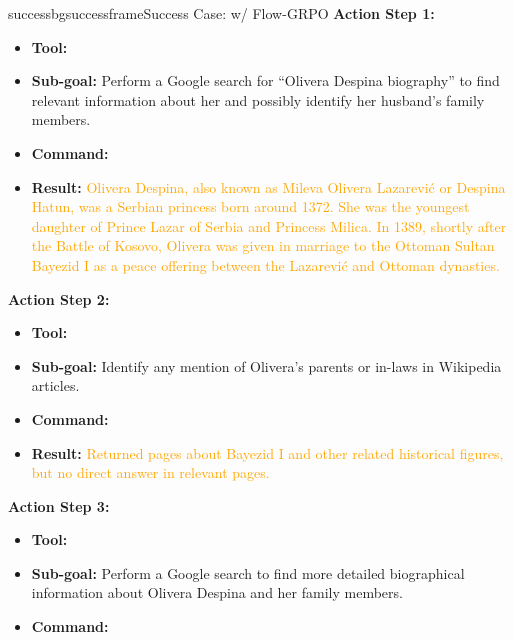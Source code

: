 \begin{small}
\begin{center}

\begin{casebox}{successbg}{successframe}{Success Case: \model w/ Flow-GRPO}
    \textbf{Action Step 1:}
    \begin{itemize}[nosep, leftmargin=*]
        \item \textbf{Tool:} 
        \item \textbf{Sub-goal:} Perform a Google search for ``Olivera Despina biography'' to find relevant information about her and possibly identify her husband's family members.
        \item \textbf{Command:}

        \item \textbf{Result:} \textcolor{orange}{Olivera Despina, also known as Mileva Olivera Lazarević or Despina Hatun, was a Serbian princess born around 1372. She was the youngest daughter of Prince Lazar of Serbia and Princess Milica. In 1389, shortly after the Battle of Kosovo, Olivera was given in marriage to the Ottoman Sultan Bayezid I as a peace offering between the Lazarević and Ottoman dynasties.}
    \end{itemize}

    \vspace{1em}

    \textbf{Action Step 2:}
    \begin{itemize}[nosep, leftmargin=*]
        \item \textbf{Tool:} 
        \item \textbf{Sub-goal:} Identify any mention of Olivera's parents or in-laws in Wikipedia articles.
        \item \textbf{Command:}

        \item \textbf{Result:} \textcolor{orange}{Returned pages about Bayezid I and other related historical figures, but no direct answer in relevant pages.}
    \end{itemize}

    \vspace{1em}

    \textbf{Action Step 3:}
    \begin{itemize}[nosep, leftmargin=*]
        \item \textbf{Tool:} 
        \item \textbf{Sub-goal:} Perform a Google search to find more detailed biographical information about Olivera Despina and her family members.
        \item \textbf{Command:}


\end{itemize}
\end{casebox}
\end{center}
\end{small}
